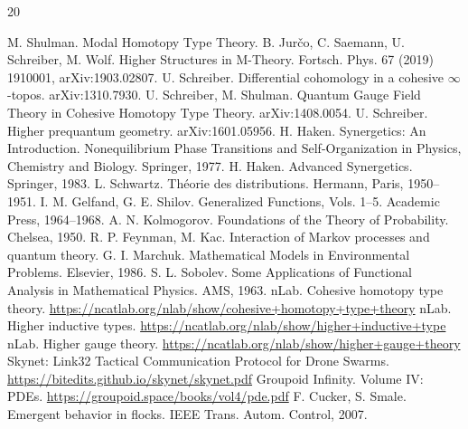 \documentclass[a4paper,12pt]{article}
\begin{document}
\begin{thebibliography}{20}

 M. Shulman. Modal Homotopy Type Theory.
 B. Jurčo, C. Saemann, U. Schreiber, M. Wolf. Higher Structures in M-Theory. Fortsch. Phys. 67 (2019) 1910001, arXiv:1903.02807.
 U. Schreiber. Differential cohomology in a cohesive \(\infty\)-topos. arXiv:1310.7930.
 U. Schreiber, M. Shulman. Quantum Gauge Field Theory in Cohesive Homotopy Type Theory. arXiv:1408.0054.
 U. Schreiber. Higher prequantum geometry. arXiv:1601.05956.
 H. Haken. Synergetics: An Introduction. Nonequilibrium Phase Transitions and Self-Organization in Physics, Chemistry and Biology. Springer, 1977.
 H. Haken. Advanced Synergetics. Springer, 1983.
 L. Schwartz. Théorie des distributions. Hermann, Paris, 1950--1951.
 I. M. Gelfand, G. E. Shilov. Generalized Functions, Vols. 1--5. Academic Press, 1964--1968.
 A. N. Kolmogorov. Foundations of the Theory of Probability. Chelsea, 1950.
 R. P. Feynman, M. Kac. Interaction of Markov processes and quantum theory. 
 G. I. Marchuk. Mathematical Models in Environmental Problems. Elsevier, 1986.
 S. L. Sobolev. Some Applications of Functional Analysis in Mathematical Physics. AMS, 1963.
 nLab. Cohesive homotopy type theory. \url{https://ncatlab.org/nlab/show/cohesive+homotopy+type+theory}
 nLab. Higher inductive types. \url{https://ncatlab.org/nlab/show/higher+inductive+type}
 nLab. Higher gauge theory. \url{https://ncatlab.org/nlab/show/higher+gauge+theory}
 Skynet: Link32 Tactical Communication Protocol for Drone Swarms. \url{https://bitedits.github.io/skynet/skynet.pdf}
 Groupoid Infinity. Volume IV: PDEs. \url{https://groupoid.space/books/vol4/pde.pdf}
 F. Cucker, S. Smale. Emergent behavior in flocks. IEEE Trans. Autom. Control, 2007.

\end{thebibliography}
\end{document}
